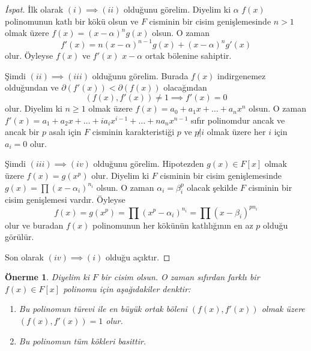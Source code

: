 \documentclass[draft]{article}
\newtheorem{prop}[thm]{Önerme}
\theoremstyle{definition}
\theoremstyle{remark}
\begin{document}
    	    \begin{proof}[İspat]
    	        İlk olarak $(i) \implies (ii)$ olduğunu görelim. Diyelim ki $\alpha$ $f(x)$ polinomunun katlı bir kökü olsun ve $F$ cisminin bir cisim genişlemesinde $n > 1$ olmak üzere $f(x) = (x - \alpha)^ng(x)$ olsun. O zaman
    	        \begin{equation*}
    	            f'(x) = n(x - \alpha)^{n - 1}g(x) + (x - \alpha)^ng'(x)
    	        \end{equation*}
    	        olur. Öyleyse $f(x)$ ve $f'(x)$ $x - \alpha$ ortak bölenine sahiptir.\par
    	        Şimdi $(ii) \implies (iii)$ olduğunu görelim. Burada $f(x)$ indirgenemez olduğundan ve $\partial(f'(x)) < \partial(f(x))$ olacağından
    	        \begin{equation*}
    	            (f(x), f'(x)) \neq 1 \implies f'(x) = 0
    	        \end{equation*}
    	        olur. Diyelim ki $n \geq 1$ olmak üzere $f(x) = a_0 + a_1x + \dots + a_nx^n$ olsun. O zaman $f'(x) = a_1 + a_2x + \dots + ia_ix^{i - 1} + \dots + na_nx^{n - 1}$ sıfır polinomdur ancak ve ancak bir $p$ asalı için $F$ cisminin karakteristiği $p$ ve $p \not| i$ olmak üzere her $i$ için $a_i = 0$ olur.\par
    	        Şimdi $(iii) \implies (iv)$ olduğunu görelim. Hipotezden $g(x) \in F[x]$ olmak üzere $f(x) = g(x^p)$ olur. Diyelim ki $F$ cisminin bir cisim genişlemesinde $g(x) = \prod{(x - \alpha_i)^{n_i}}$ olsun. O zaman $\alpha_i = \beta_i^p$ olacak şekilde $F$ cisminin bir cisim genişlemesi vardır. Öyleyse
    	        \begin{equation*}
    	            f(x) = g(x^p) = \prod{(x^p - \alpha_i)^{n_i}} = \prod{(x - \beta_i)^{pn_i}}
    	        \end{equation*}
    	        olur ve buradan $f(x)$ polinomunun her kökünün katlılığının en az $p$ olduğu görülür.\par
    	        Son olarak $(iv) \implies (i)$ olduğu açıktır.
    	    \end{proof}
    	    
    	    \begin{prop}
    	        Diyelim ki $F$ bir cisim olsun. O zaman sıfırdan farklı bir $f(x) \in F[x]$ polinomu için aşağıdakiler denktir:
    	        \begin{enumerate}
				\renewcommand{\labelenumi}{(\roman{enumi})}
				    \item Bu polinomun türevi ile en büyük ortak böleni $(f(x), f'(x))$ olmak üzere $(f(x), f'(x)) = 1$ olur.
				    \item Bu polinomun tüm kökleri basittir.
				\end{enumerate}
    	    \end{prop}
    	    
\end{document}
